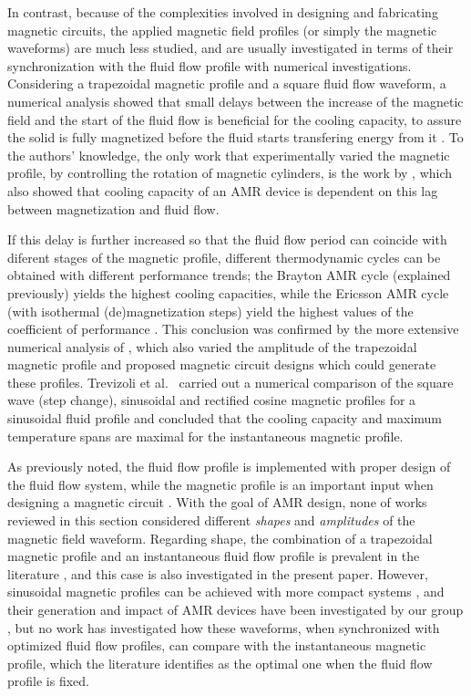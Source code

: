 \documentclass[referee]{svjour3}
\begin{document}
In contrast, because of the complexities involved in designing and fabricating magnetic circuits, the applied magnetic field profiles (or simply the magnetic waveforms) are much less studied, and are usually investigated in terms of their synchronization with the fluid flow profile with numerical investigations. Considering a trapezoidal magnetic profile and a square fluid flow waveform, a numerical analysis showed that small delays between the increase of the magnetic field and the start of the fluid flow is beneficial for the cooling capacity, to assure the solid is fully magnetized before the fluid starts transfering energy from it \cite{bib:bjoerk11_amr}. To the authors' knowledge, the only work that experimentally varied the magnetic profile, by controlling the rotation of magnetic cylinders, is the work by \cite{bib:benedict16_desig}, which also showed that cooling capacity of an AMR device is dependent on this lag between magnetization and fluid flow.

If this delay is further increased so that the fluid flow period can coincide with diferent stages of the magnetic profile, different thermodynamic cycles can be obtained with different performance trends; the Brayton AMR cycle (explained previously) yields the highest cooling capacities, while the Ericsson AMR cycle (with isothermal (de)magnetization steps) yield the highest values of the coefficient of performance \cite{bib:plaznik13-numer}. This conclusion was confirmed by the more extensive numerical analysis of \cite{bib:kitanovski}, which also varied the amplitude of the trapezoidal magnetic profile and proposed magnetic circuit designs which could generate these profiles.  Trevizoli et al.~\cite{bib:asme-mce} carried out a numerical comparison of the square wave (step change), sinusoidal and rectified cosine magnetic profiles for a sinusoidal fluid profile and concluded that the cooling capacity and maximum temperature spans are maximal for the instantaneous magnetic profile. 

As previously noted, the fluid flow profile is implemented with proper design of the fluid flow system, while the magnetic profile is an important input when designing a magnetic circuit \cite{bib:oh13-air}. With the goal of AMR design, none of works reviewed in this section considered different \emph{shapes} and \emph{amplitudes} of the magnetic field waveform. Regarding shape, the combination of a trapezoidal magnetic profile and an instantaneous fluid flow profile is prevalent in the literature \cite{bib:bjoerk11_amr,bib:benedict16_desig,bib:park17-devel-k-k}, and this case is also investigated in the present paper. However, sinusoidal magnetic profiles can be achieved with more compact systems \cite{bib:trevizoli16_pump}, and their generation and impact of AMR devices have been investigated by  our group \cite{FORTKAMP201787,bib:fortkamp20-desig}, but no work has investigated how these waveforms, when synchronized with optimized fluid flow profiles, can compare with the instantaneous magnetic profile, which the literature identifies as the optimal one when the fluid flow profile is fixed.
\end{document}
